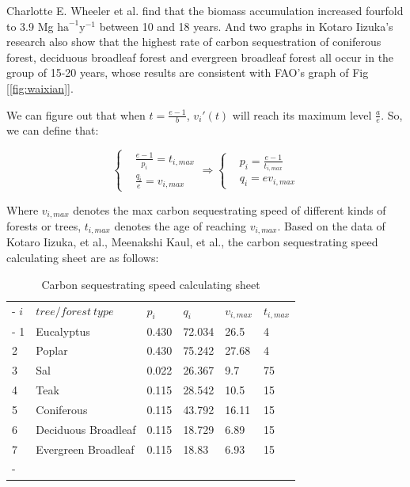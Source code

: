 Charlotte E. Wheeler et al. \cite{3} find that the biomass accumulation increased fourfold to 3.9 Mg $\text{ha}^{-1} \text{y}^{-1}$ between 10 and 18 years.
And two graphs in Kotaro Iizuka's research \cite{4} also show that the highest rate of carbon sequestration of coniferous forest, deciduous broadleaf forest and evergreen broadleaf forest all occur in the group of 15-20 years, whose results are consistent with FAO's graph of Fig [\ref{fig:waixian}].

We can figure out that when $t = \frac{e-1}{b}$, $v_{i}'(t)$ will reach its maximum level $\frac{a}{e}$. So, we can define that:

\begin{equation}
\left\{
    \begin{aligned}
        &\frac{e-1}{p_i} = t_{i, max} \\ &\frac{q_i}{e} = v_{i, max}
    \end{aligned}
\right.    
\Rightarrow
\left\{
    \begin{aligned}
        &p_i = \frac{e-1}{t_{i, max}} \\ &q_i = ev_{i, max}
    \end{aligned}
\right.    
\end{equation}

Where $v_{i, max}$ denotes the max carbon sequestrating speed of different kinds of forests or trees, $t_{i, max}$ denotes the age of reaching $v_{i, max}$. Based on the data of Kotaro Iizuka, et al.\cite{4}, Meenakshi Kaul, et al.\cite{5}, the carbon sequestrating speed calculating sheet are as follows:

\begin{table}[h]
	\centering
	\caption{Carbon sequestrating speed calculating sheet}
	\tabulinesep=1.1mm
	\begin{tabu}to \linewidth{X[c,m]X[2.5,c,m]X[c,m]X[c,m]X[c,m]X[c,m]}
		\tabucline[0.08em]-
		$i$ & $tree / forest\ type$          & $p_i$     & $q_i$     & $v_{i, max}$  & $t_{i, max}$\\\tabucline[0.08em]-
		1	& Eucalyptus                    & 0.430     & 72.034    & 26.5 	        & 4\\
		2	& Poplar                        & 0.430	    & 75.242 	& 27.68 	    & 4\\
		3	& Sal                           & 0.022	    & 26.367 	& 9.7 	        & 75\\
		4	& Teak                          & 0.115	    & 28.542 	& 10.5 	        & 15\\
		5	& Coniferous                    & 0.115     & 43.792 	& 16.11 	    & 15\\
		6	& Deciduous Broadleaf           & 0.115     & 18.729 	& 6.89 	        & 15\\
		7	& Evergreen Broadleaf           & 0.115     & 18.83     & 6.93 	        & 15\\
		\tabucline[0.08em]-
	\end{tabu}
    \label{table}
\end{table}

